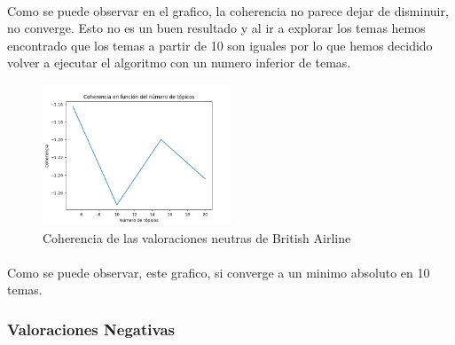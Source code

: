 \documentclass{report}
\begin{document}
{{                    \paragraph*{}{
                        Como se puede observar en el grafico, la coherencia no parece dejar de disminuir, no converge.
                        Esto no es un buen resultado y al ir a explorar los temas hemos encontrado que los temas a partir de 10 son iguales por lo que hemos decidido volver a ejecutar el algoritmo con un numero inferior de temas.
                    }
                    \begin{figure}[H]
                        \centering
                        \includegraphics[width=0.5\textwidth]{./img/british_airline_neutras2.png}
                        \caption{Coherencia de las valoraciones neutras de British Airline}
                    \end{figure}
                    \paragraph*{}{
                        Como se puede observar, este grafico, si converge a un minimo absoluto en 10 temas.
                    }
                \clearpage\subsubsection*{Valoraciones Negativas}
}}
\end{document}
